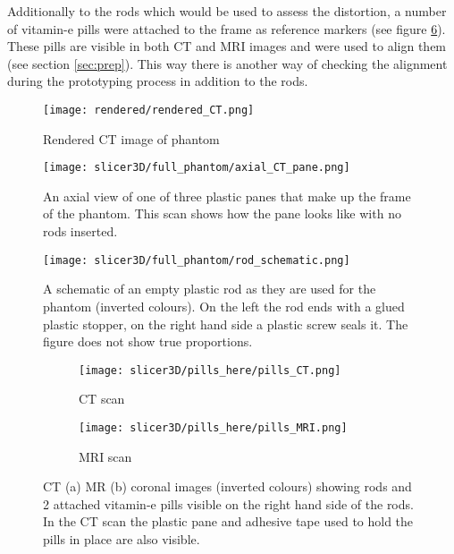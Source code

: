 Additionally to the rods which would be used to assess the distortion, a number of vitamin-e pills were attached to the frame as reference markers (see figure \ref{fig:pills}).
These pills are visible in both CT and MRI images and were used to align them (see section \ref{sec:prep}).
This way there is another way of checking the alignment during the prototyping process in addition to the rods.


\begin{figure}[!bp]
\centering
\texttt{[image: rendered/rendered\_CT.png]}
\caption{Rendered CT image of phantom}
\label{fig:rendered_CT}
\end{figure}


\begin{figure}[!tbp]
\centering
\texttt{[image: slicer3D/full\_phantom/axial\_CT\_pane.png]}
\caption{An axial view of one of three plastic panes that make up the frame of the phantom. This scan shows how the pane looks like with no rods inserted.}
\label{fig:axial_CT_pane}
\end{figure}

\begin{figure}[!tbp]
\centering
\texttt{[image: slicer3D/full\_phantom/rod\_schematic.png]}
\caption{A schematic of an empty plastic rod as they are used for the phantom (inverted colours). On the left the rod ends with a glued plastic stopper, on the right hand side a plastic screw seals it. The figure does not show true proportions.}
\label{fig:rod_schematic}
\end{figure}


\begin{figure}[!thb]
\centering
  \begin{subfigure}[b]{0.45\textwidth}
  \centering
    \texttt{[image: slicer3D/pills\_here/pills\_CT.png]}
    \caption{CT scan}
    \label{fig:pills_CT}
  \end{subfigure}
  \begin{subfigure}[b]{0.45\textwidth}
  \centering
      \texttt{[image: slicer3D/pills\_here/pills\_MRI.png]}
    \caption{MRI scan}
    \label{fig:pills_MR}
  \end{subfigure}
  \caption{CT (a) MR (b) coronal images (inverted colours) showing rods and 2 attached vitamin-e pills visible on the right hand side of the rods. In the CT scan the plastic pane and adhesive tape used to hold the pills in place are also visible.}
  \label{fig:pills}
\end{figure}

